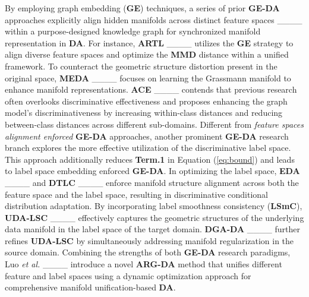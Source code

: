 By employing graph embedding (\textbf{GE}) techniques, a series of prior \textbf{GE-DA} approaches explicitly align hidden manifolds across distinct feature spaces ____ within a purpose-designed knowledge graph for synchronized manifold representation in \textbf{DA}. For instance, \textbf{ARTL} ____ utilizes the \textbf{GE} strategy to align diverse feature spaces and optimize the \textbf{MMD} distance within a unified framework. To counteract the geometric structure distortion present in the original space, \textbf{MEDA} ____ focuses on learning the Grassmann manifold to enhance manifold representations. \textbf{ACE} ____ contends that previous research often overlooks discriminative effectiveness and proposes enhancing the graph model's discriminativeness by increasing within-class distances and reducing between-class distances across different sub-domains. Different from \textit{feature spaces alignment enforced} \textbf{GE-DA} approaches, another prominent \textbf{GE-DA} research branch explores the more effective utilization of the discriminative label space. This approach additionally reduces \textbf{Term.1} in Equation (\ref{eq:bound}) and leads to label space embedding enforced \textbf{GE-DA}. In optimizing the label space, \textbf{EDA} ____ and \textbf{DTLC} ____ enforce manifold structure alignment across both the feature space and the label space, resulting in discriminative conditional distribution adaptation. By incorporating label smoothness consistency (\textbf{LSmC}), \textbf{UDA-LSC} ____ effectively captures the geometric structures of the underlying data manifold in the label space of the target domain. \textbf{DGA-DA} ____ further refines \textbf{UDA-LSC} by simultaneously addressing manifold regularization in the source domain. Combining the strengths of both \textbf{GE-DA} research paradigms, Luo \textit{et al.} ____ introduce a novel \textbf{ARG-DA}  method that unifies different feature and label spaces using a dynamic optimization approach for comprehensive manifold unification-based \textbf{DA}.







